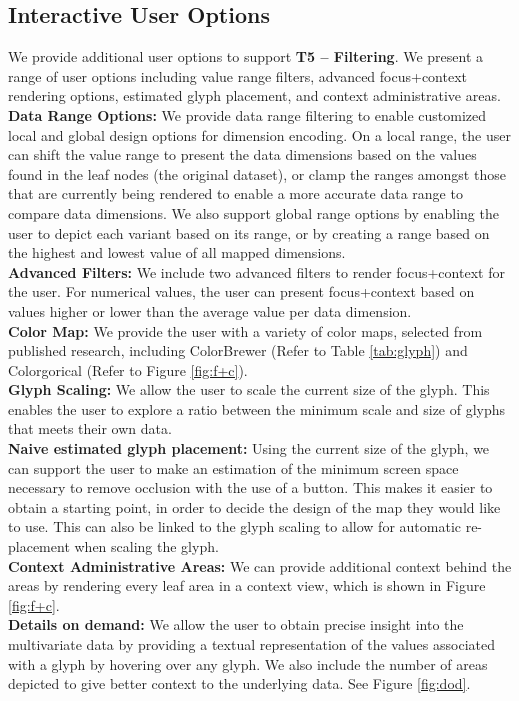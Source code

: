 \subsection{Interactive User Options} \label{sec:options}
We provide additional user options to support \textbf{T5 -- Filtering}. We present a range of user options including value range filters, advanced focus+context rendering options, estimated glyph placement, and context administrative areas.\\
\textbf{Data Range Options:} We provide data range filtering to enable customized local and global design options for dimension encoding. On a local range, the user can shift the value range to present the data dimensions based on the values found in the leaf nodes (the original dataset), or clamp the ranges amongst those that are currently being rendered to enable a more accurate data range to compare data dimensions. We also support global range options by enabling the user to depict each variant based on its range, or by creating a range based on the highest and lowest value of all mapped dimensions.  \\
\textbf{Advanced Filters:} We include two advanced filters to render focus+context for the user. For numerical values, the user can present focus+context based on values higher or lower than the average value per data dimension.\\
\textbf{Color Map:} We provide the user with a variety of color maps, selected from published research, including ColorBrewer \cite{brewer2003transition} (Refer to Table \ref{tab:glyph}) and Colorgorical \cite{gramazio2017colorgorical} (Refer to Figure \ref{fig:f+c}).\\
\textbf{Glyph Scaling:} We allow the user to scale the current size of the glyph. This enables the user to explore a ratio between the minimum scale and size of glyphs that meets their own data.\\
\textbf{Naive estimated glyph placement:} Using the current size of the glyph, we can support the user to make an estimation of the minimum screen space necessary to remove occlusion with the use of a button. This makes it easier to obtain a starting point, in order to decide the design of the map they would like to use. This can also be linked to the glyph scaling to allow for automatic re-placement when scaling the glyph.\\
\textbf{Context Administrative Areas:} We can provide additional context behind the areas by rendering every leaf area in a context view, which is shown in Figure \ref{fig:f+c}.\\
\textbf{Details on demand:} We allow the user to obtain precise insight into the multivariate data by providing a textual representation of the values associated with a glyph by hovering over any glyph. We also include the number of areas depicted to give better context to the underlying data. See Figure \ref{fig:dod}.

